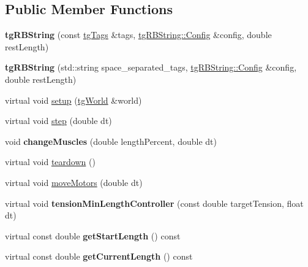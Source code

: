 \subsection*{Public Member Functions}
\begin{DoxyCompactItemize}
\item 
\hypertarget{classtg_r_b_string_acc6eaa3b489869bfb4acd16ecec86a34}{{\bfseries tg\-R\-B\-String} (const \hyperlink{classtg_tags}{tg\-Tags} \&tags, \hyperlink{structtg_r_b_string_1_1_config}{tg\-R\-B\-String\-::\-Config} \&config, double rest\-Length)}\label{classtg_r_b_string_acc6eaa3b489869bfb4acd16ecec86a34}

\item 
\hypertarget{classtg_r_b_string_a798cf1ea387f8e398fae8a3d2db48ad3}{{\bfseries tg\-R\-B\-String} (std\-::string space\-\_\-separated\-\_\-tags, \hyperlink{structtg_r_b_string_1_1_config}{tg\-R\-B\-String\-::\-Config} \&config, double rest\-Length)}\label{classtg_r_b_string_a798cf1ea387f8e398fae8a3d2db48ad3}

\item 
virtual void \hyperlink{classtg_r_b_string_a57298f001da09ec54a717033713a788b}{setup} (\hyperlink{classtg_world}{tg\-World} \&world)
\item 
virtual void \hyperlink{classtg_r_b_string_a656dac3acb8e7d4f4204a5bb2ea6ce06}{step} (double dt)
\item 
\hypertarget{classtg_r_b_string_a01b1f50e62ecb1e0025186e2981096de}{void {\bfseries change\-Muscles} (double length\-Percent, double dt)}\label{classtg_r_b_string_a01b1f50e62ecb1e0025186e2981096de}

\item 
virtual void \hyperlink{classtg_r_b_string_a5f4f77b849a87188569a528937f90a97}{teardown} ()
\item 
virtual void \hyperlink{classtg_r_b_string_a2f70622288b437ed6f065fd0c8602ec0}{move\-Motors} (double dt)
\item 
\hypertarget{classtg_r_b_string_a7527c3fc94539784a7bbdfec42a67881}{virtual void {\bfseries tension\-Min\-Length\-Controller} (const double target\-Tension, float dt)}\label{classtg_r_b_string_a7527c3fc94539784a7bbdfec42a67881}

\item 
\hypertarget{classtg_r_b_string_a357f579b22e239b109e1c12fc0c84949}{virtual const double {\bfseries get\-Start\-Length} () const }\label{classtg_r_b_string_a357f579b22e239b109e1c12fc0c84949}

\item 
\hypertarget{classtg_r_b_string_a0782c81cd1eaddfe83e269db720e4b16}{virtual const double {\bfseries get\-Current\-Length} () const }\label{classtg_r_b_string_a0782c81cd1eaddfe83e269db720e4b16}


\end{DoxyCompactItemize}
